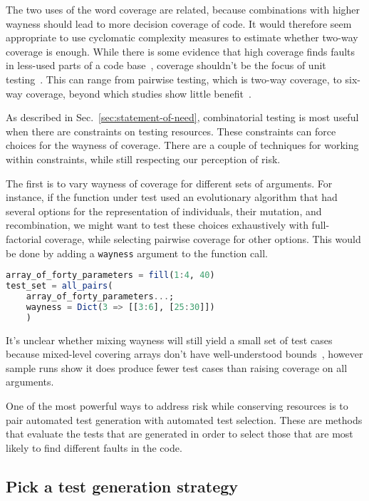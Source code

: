 \documentclass{juliacon}
\begin{document}
\vskip 6pt
The two uses of the word coverage are related, because combinations with higher wayness should lead to more decision coverage of code. It would therefore seem appropriate to use cyclomatic complexity measures to estimate whether two-way coverage is enough. While there is some evidence that high coverage finds faults in less-used parts of a code base~\cite{Cai2005-ex}, coverage shouldn't be the focus of unit testing~\cite{Inozemtseva2014-gz}. This can range from pairwise testing, which is two-way coverage, to six-way coverage, beyond which studies show little benefit~\cite{Petke2015-ex}.

\vskip 6pt
As described in Sec.~\ref{sec:statement-of-need}, combinatorial testing is most useful when there are constraints on testing resources. These constraints can force choices for the wayness of coverage. There are a couple of techniques for working within constraints, while still respecting our perception of risk.

\vskip 6pt
The first is to vary wayness of coverage for different sets of arguments. For instance, if the function under test used an evolutionary algorithm that had several options for the representation of individuals, their mutation, and recombination, we might want to test these choices exhaustively with full-factorial coverage, while selecting pairwise coverage for other options. This would be done by adding a \verb|wayness| argument to the function call.

\begin{lstlisting}[language=Julia]
array_of_forty_parameters = fill(1:4, 40)
test_set = all_pairs(
    array_of_forty_parameters...;
    wayness = Dict(3 => [[3:6], [25:30]])
    )
\end{lstlisting}
It's unclear whether mixing wayness will still yield a small set of test cases because mixed-level covering arrays don't have well-understood bounds~\cite{Cohen2003-pg}, however sample runs show it does produce fewer test cases than raising coverage on all arguments.

\vskip 6pt
One of the most powerful ways to address risk while conserving resources is to pair automated test generation with automated test selection. These are methods that evaluate the tests that are generated in order to select those that are most likely to find different faults in the code.

\subsection{Pick a test generation strategy}
\end{document}
